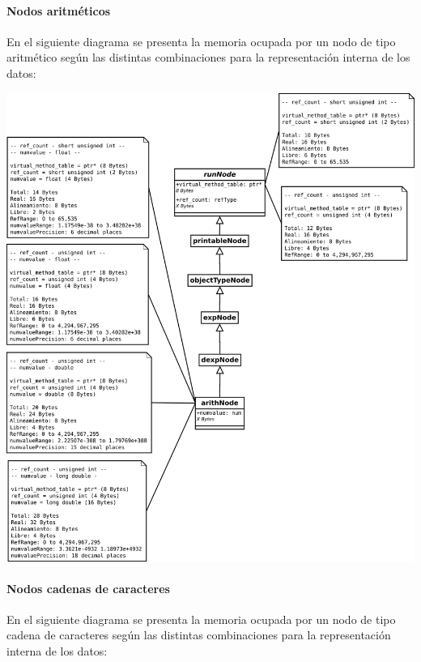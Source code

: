 \pagebreak 
\paragraph{Nodos aritméticos}

En el siguiente diagrama se presenta la memoria ocupada por un nodo de tipo aritmético según las distintas combinaciones para la representación interna de los datos:

\begin{center}
\includegraphics[scale=0.3]{memorySpaceArith.png} \\
\end{center}

\pagebreak 
\paragraph{Nodos cadenas de caracteres}

En el siguiente diagrama se presenta la memoria ocupada por un nodo de tipo cadena de caracteres según las distintas combinaciones para la representación interna de los datos:

